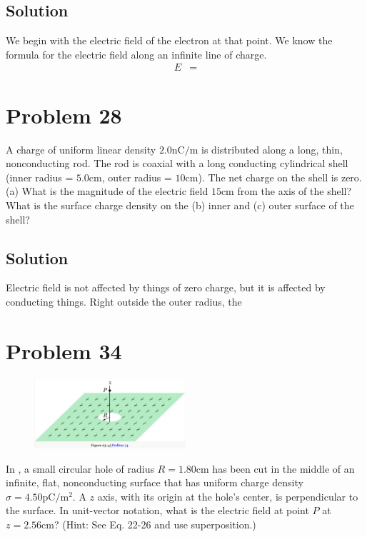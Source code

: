 \documentclass[12pt]{article}
\begin{document}
\subsection*{Solution}
We begin with the electric field of the electron at that point. We know the formula for the electric field along an infinite line of charge.
\begin{align*}
    E   &=  
\end{align*}

\section{Problem 28}
A charge of uniform linear density $2.0 \unit{\nano\coulomb/\meter}$ is distributed along a long, thin, nonconducting rod. The rod is coaxial with a long conducting cylindrical shell (inner radius = $5.0 \unit{\centi\meter}$, outer radius = $10 \unit{\centi\meter}$). The net charge on the shell is zero. (a) What is the magnitude of the electric field $15 \unit{\centi\meter}$ from the axis of the shell? What is the surface charge density on the (b) inner and (c) outer surface of the shell?

\subsection{Solution}
Electric field is not affected by things of zero charge, but it is affected by conducting things. Right outside the outer radius, the 

\pagebreak
\section{Problem 34}
\begin{figure}
    \vspace{-30pt}
    \includegraphics[width=0.5\textwidth]{picture_10.png} 
\end{figure}
In , a small circular hole of radius $R = 1.80 \unit{\centi\meter}$ has been cut in the middle of an infinite, flat, nonconducting surface that has uniform charge density $\sigma = 4.50 \unit{\pico\coulomb/\meter^2}$. A $z$ axis, with its origin at the hole's center, is perpendicular to the surface. In unit-vector notation, what is the electric field at point $P$ at $z = 2.56 \unit{\centi\meter}$? (Hint: See Eq. 22-26 and use superposition.)
\end{document}

